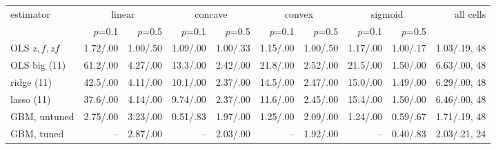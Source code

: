 \begin{tabular}{lrrrrrrrrr}
\toprule
estimator & \multicolumn{2}{c}{linear} & \multicolumn{2}{c}{concave} & \multicolumn{2}{c}{convex} & \multicolumn{2}{c}{sigmoid} & all cells \\
\cmidrule(lr){2-3}\cmidrule(lr){4-5}\cmidrule(lr){6-7}\cmidrule(lr){8-9}
 & $p$=0.1 & $p$=0.5 & $p$=0.1 & $p$=0.5 & $p$=0.1 & $p$=0.5 & $p$=0.1 & $p$=0.5 & \\
\midrule
OLS $z,f,zf$ & 1.72/.00 & 1.00/.50 & 1.09/.00 & 1.00/.33 & 1.15/.00 & 1.00/.50 & 1.17/.00 & 1.00/.17 & 1.03/.19, 48 \\
OLS big (11) & 61.2/.00 & 4.27/.00 & 13.3/.00 & 2.42/.00 & 21.8/.00 & 2.52/.00 & 21.5/.00 & 1.50/.00 & 6.63/.00, 48 \\
ridge (11) & 42.5/.00 & 4.11/.00 & 10.1/.00 & 2.37/.00 & 14.5/.00 & 2.47/.00 & 15.0/.00 & 1.49/.00 & 6.29/.00, 48 \\
lasso (11) & 37.6/.00 & 4.14/.00 & 9.74/.00 & 2.37/.00 & 11.6/.00 & 2.45/.00 & 15.4/.00 & 1.50/.00 & 6.46/.00, 48 \\
GBM, untuned & 2.75/.00 & 3.23/.00 & 0.51/.83 & 1.97/.00 & 1.25/.00 & 2.09/.00 & 1.24/.00 & 0.59/.67 & 1.71/.19, 48 \\
GBM, tuned & -- & 2.87/.00 & -- & 2.03/.00 & -- & 1.92/.00 & -- & 0.40/.83 & 2.03/.21, 24 \\
\bottomrule
\end{tabular}
